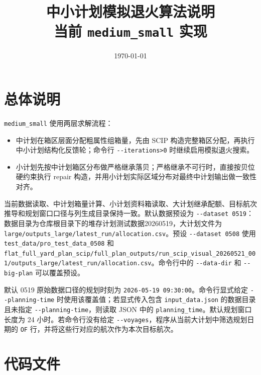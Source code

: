 \documentclass[UTF8,a4paper,11pt]{ctexart}
\title{中小计划模拟退火算法说明\\
\large 当前 \texttt{medium\_small} 实现}
\author{}
\date{\today}
\newcommand{\code}[1]{\nolinkurl{#1}}
\begin{document}
\maketitle
\tableofcontents
\newpage

\section{总体说明}

\code{medium_small} 使用两层求解流程：
\begin{itemize}
  \item 中计划在箱区层面分配粗属性组箱量，先由 SCIP 构造完整箱区分配，再执行中小计划结构化反馈轮；命令行 \code{--iterations>0} 时继续启用模拟退火搜索。
  \item 小计划先按中计划箱区分布做严格继承落贝；严格继承不可行时，直接按贝位硬约束执行 repair 构造，并用小计划实际区域分布对最终中计划输出做一致性对齐。
\end{itemize}

当前数据读取、中计划箱量计算、小计划资料箱读取、大计划继承配额、目标航次推导和规划窗口口径与列生成目录保持一致。默认数据预设为 \code{--dataset 0519}：数据目录为仓库根目录下的堆存计划测试数据20260519，大计划文件为 \code{large/outputs_large/latest_run/allocation.csv}。预设 \code{--dataset 0508} 使用 \code{test_data/pro_test_data_0508} 和 \code{flat_full_yard_plan_scip/full_plan_outputs/run_scip_visual_20260521_001/outputs_large/latest_run/allocation.csv}。命令行中的 \code{--data-dir} 和 \code{--big-plan} 可以覆盖预设。

默认 0519 原始数据口径的规划时刻为 \code{2026-05-19 09:30:00}。命令行显式给定 \code{--planning-time} 时使用该覆盖值；若显式传入包含 \code{input_data.json} 的数据目录且未指定 \code{--planning-time}，则读取 JSON 中的 \code{planning_time}。默认规划窗口长度为 24 小时。若命令行没有给定 \code{--voyages}，程序从当前大计划中筛选规划日期的 \code{OF} 行，并将这些行对应的航次作为本次目标航次。

\section{代码文件}
\end{document}
